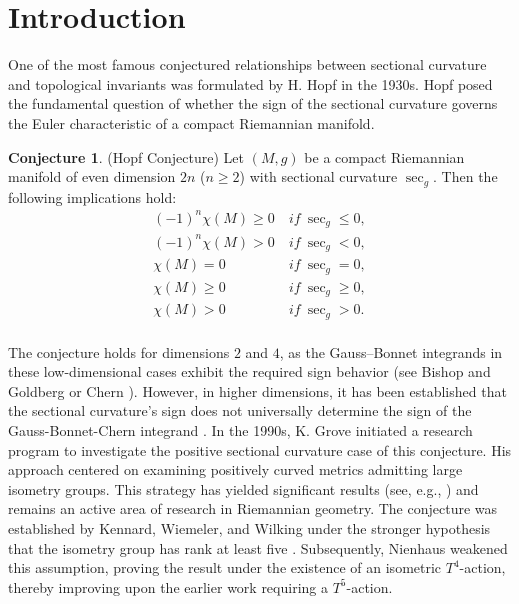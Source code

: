 \documentclass[12pt, twoside]{article}
\theoremstyle{definition}
\numberwithin{equation}{section}
\newtheorem{conjecture}{Conjecture}
\begin{document}
\section{Introduction}
One of the most famous conjectured relationships between sectional curvature and topological invariants was formulated by H. Hopf in the 1930s. Hopf posed the fundamental question of whether the sign of the sectional curvature governs the Euler characteristic of a compact Riemannian manifold.
\begin{conjecture}(Hopf Conjecture)
Let $(M,g)$ be a compact Riemannian manifold of even dimension $2n$ ($n \geq 2$) with sectional curvature $\sec_g$. Then the following implications hold:
\begin{equation*}
\begin{split}
(-1)^{n}\chi(M)\geq0\ & if\ \sec_{g}\leq0,\\
(-1)^{n}\chi(M)>0\ & if\ \sec_{g}<0,\\
\chi(M)=0\ & if\ \sec_{g}=0,\\
\chi(M)\geq0\  & if\ \sec_{g}\geq0,\\
\chi(M)>0\ & if\ \sec_{g}>0.\\
\end{split}
\end{equation*}	
\end{conjecture}
The conjecture holds for dimensions $2$ and $4$, as the Gauss–Bonnet integrands in these low-dimensional cases exhibit the required sign behavior (see Bishop and Goldberg \cite{BG64} or Chern \cite{Che55}). However, in higher dimensions, it has been established that the sectional curvature's sign does not universally determine the sign of the Gauss-Bonnet-Chern integrand \cite{Ger76}. In the 1990s, K. Grove initiated a research program to investigate the positive sectional curvature case of this conjecture. His approach centered on examining positively curved metrics admitting large isometry groups. This strategy has yielded significant results (see, e.g., \cite{FR04,Ken13,RS05,Wil03}) and remains an active area of research in Riemannian geometry. The conjecture was established by Kennard, Wiemeler, and Wilking under the stronger hypothesis that the isometry group has rank at least five \cite{KWW21}. Subsequently, Nienhaus \cite{Nie22} weakened this assumption, proving the result under the existence of an isometric $T^{4}$-action, thereby improving upon the earlier work requiring a $T^{5}$-action.
\end{document}
